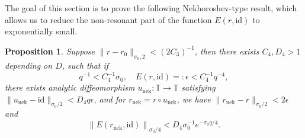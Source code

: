 \documentclass[12pt,reqno]{amsart}
\newtheorem{prop}[thm]{Proposition}
\theoremstyle{remark}
\begin{document}
The goal of this section is to prove the following Nekhoroshev-type result, which allows us to reduce the non-resonant part of the function $E(r, {\mathrm{id}})$ to exponentially small. 
\begin{prop}\label{prop:nek}
Suppose $\|r - r_0\|_{\sigma_0, 2} < (2C_3)^{-1}$, then there exists $C_4, D_4 > 1$ depending on $D$, such that if 
\[
	q^{-1} < C_4^{-1} \sigma_0, \quad E(r, {\mathrm{id}}) =: \epsilon  < C_4^{-1} q^{-4}, 
\]
there exists analytic diffeomorphism  $u_{{\mathrm{nek}}}: {\mathbb{T}} \to {\mathbb{T}}$ satisfying $\|u_{{\mathrm{nek}}} - {\mathrm{id}}\|_{\sigma_0/2}< D_4 q\epsilon$, and for  $r_{{\mathrm{nek}}} = r \circ u_{{\mathrm{nek}}}$, we have  $\|r_{{\mathrm{nek}}} - r\|_{\sigma_0/2} < 2 \epsilon$ and 
\[
	\left\| E(r_{{\mathrm{nek}}}, {\mathrm{id}})\right\|_{\sigma_0/4} < D_4  \sigma_0^{-1}  e^{- \sigma_0 q/4}. 
\]
\end{prop}
\end{document}
